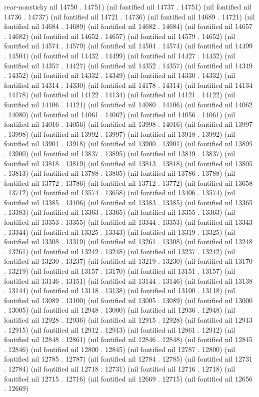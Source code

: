 rear-nonsticky nil 14750 . 14751) (nil fontified nil 14737 . 14751) (nil fontified nil 14736 . 14737) (nil fontified nil 14721 . 14736) (nil fontified nil 14689 . 14721) (nil fontified nil 14684 . 14689) (nil fontified nil 14682 . 14684) (nil fontified nil 14657 . 14682) (nil fontified nil 14652 . 14657) (nil fontified nil 14579 . 14652) (nil fontified nil 14574 . 14579) (nil fontified nil 14504 . 14574) (nil fontified nil 14499 . 14504) (nil fontified nil 14432 . 14499) (nil fontified nil 14427 . 14432) (nil fontified nil 14357 . 14427) (nil fontified nil 14352 . 14357) (nil fontified nil 14349 . 14352) (nil fontified nil 14332 . 14349) (nil fontified nil 14330 . 14332) (nil fontified nil 14314 . 14330) (nil fontified nil 14178 . 14314) (nil fontified nil 14134 . 14178) (nil fontified nil 14122 . 14134) (nil fontified nil 14121 . 14122) (nil fontified nil 14106 . 14121) (nil fontified nil 14080 . 14106) (nil fontified nil 14062 . 14080) (nil fontified nil 14061 . 14062) (nil fontified nil 14056 . 14061) (nil fontified nil 14016 . 14056) (nil fontified nil 13998 . 14016) (nil fontified nil 13997 . 13998) (nil fontified nil 13992 . 13997) (nil fontified nil 13918 . 13992) (nil fontified nil 13901 . 13918) (nil fontified nil 13900 . 13901) (nil fontified nil 13895 . 13900) (nil fontified nil 13837 . 13895) (nil fontified nil 13819 . 13837) (nil fontified nil 13818 . 13819) (nil fontified nil 13813 . 13818) (nil fontified nil 13805 . 13813) (nil fontified nil 13788 . 13805) (nil fontified nil 13786 . 13788) (nil fontified nil 13772 . 13786) (nil fontified nil 13712 . 13772) (nil fontified nil 13658 . 13712) (nil fontified nil 13574 . 13658) (nil fontified nil 13406 . 13574) (nil fontified nil 13385 . 13406) (nil fontified nil 13383 . 13385) (nil fontified nil 13365 . 13383) (nil fontified nil 13363 . 13365) (nil fontified nil 13355 . 13363) (nil fontified nil 13353 . 13355) (nil fontified nil 13344 . 13353) (nil fontified nil 13343 . 13344) (nil fontified nil 13325 . 13343) (nil fontified nil 13319 . 13325) (nil fontified nil 13308 . 13319) (nil fontified nil 13261 . 13308) (nil fontified nil 13248 . 13261) (nil fontified nil 13242 . 13248) (nil fontified nil 13237 . 13242) (nil fontified nil 13230 . 13237) (nil fontified nil 13219 . 13230) (nil fontified nil 13170 . 13219) (nil fontified nil 13157 . 13170) (nil fontified nil 13151 . 13157) (nil fontified nil 13146 . 13151) (nil fontified nil 13144 . 13146) (nil fontified nil 13138 . 13144) (nil fontified nil 13118 . 13138) (nil fontified nil 13100 . 13118) (nil fontified nil 13089 . 13100) (nil fontified nil 13005 . 13089) (nil fontified nil 13000 . 13005) (nil fontified nil 12948 . 13000) (nil fontified nil 12936 . 12948) (nil fontified nil 12928 . 12936) (nil fontified nil 12915 . 12928) (nil fontified nil 12913 . 12915) (nil fontified nil 12912 . 12913) (nil fontified nil 12861 . 12912) (nil fontified nil 12848 . 12861) (nil fontified nil 12846 . 12848) (nil fontified nil 12845 . 12846) (nil fontified nil 12800 . 12845) (nil fontified nil 12787 . 12800) (nil fontified nil 12785 . 12787) (nil fontified nil 12784 . 12785) (nil fontified nil 12731 . 12784) (nil fontified nil 12718 . 12731) (nil fontified nil 12716 . 12718) (nil fontified nil 12715 . 12716) (nil fontified nil 12669 . 12715) (nil fontified nil 12656 . 12669) 